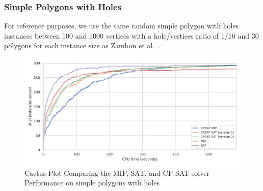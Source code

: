 \subsubsection{Simple Polygons with Holes}
For reference purposes, we use the same random simple polygon with holes instances between 100 and 1000 vertices with a hole/vertices ratio of 1/10 and 30 polygons for each instance size as Zambon et al.~\cite{art-gallery-instances-page}.



\begin{figure}[htbp]
\centering
\includegraphics[scale=0.7]{Thesis/figures/final_benchmark_cactus_plot_runtime_MIP_SAT_CPSAT_with_holes.png}
\caption{Cactus Plot Comparing the MIP, SAT, and CP-SAT solver Performance on simple polygons with holes}
\label{fig:cactus_all_simple_with_holes}
\end{figure}

